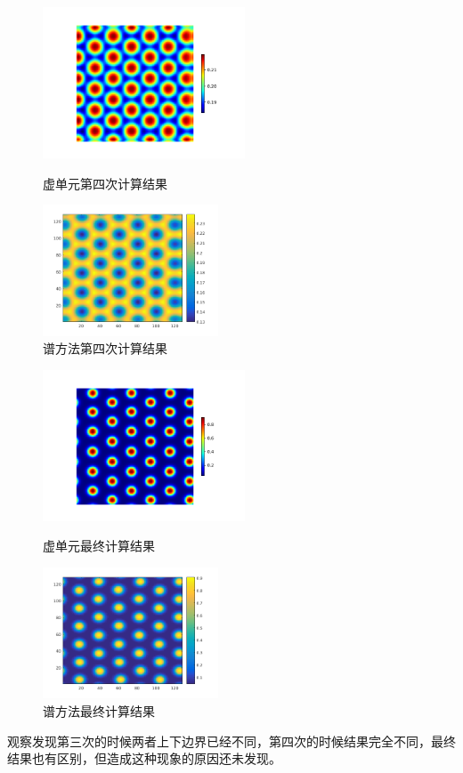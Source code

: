 \documentclass[12pt]{article}
\begin{document}
\begin{CJK}{UTF8}{gkai}
\begin{figure}[H]
\begin{minipage}[!htbp]{0.3\linewidth}
		\includegraphics[width=6cm]{scftfigure4.png}
		\caption*{虚单元第四次计算结果}
	\end{minipage}
	\hspace{0.23in}
	\begin{minipage}[!htbp]{0.3\linewidth}
		\includegraphics[width=5.2cm]{4.png}
		\caption*{谱方法第四次计算结果}
	\end{minipage}
\end{figure} 
  \begin{figure}[H]
	\setlength{\abovecaptionskip}{0.cm}
	\setlength{\belowcaptionskip}{-0.cm}
	\begin{minipage}[!htbp]{0.3\linewidth}
		\includegraphics[width=6cm]{scftfigure675.png}
		\caption*{虚单元最终计算结果}
	\end{minipage}
	\hspace{0.23in}
	\begin{minipage}[!htbp]{0.3\linewidth}
		\includegraphics[width=5.2cm]{128.png}
		\caption*{谱方法最终计算结果}
	\end{minipage}
\end{figure}
观察发现第三次的时候两者上下边界已经不同，第四次的时候结果完全不同，最终结果也有区别，但造成这种现象的原因还未发现。

\end{CJK}
\end{document}
